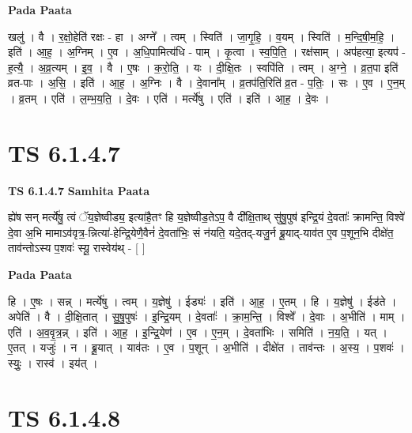 \documentclass[17pt]{extarticle}
\begin{document}
\textbf{Pada Paata} \newline

खलु॑ । वै । र॒क्षो॒हेति॑ रक्षः - हा । अग्ने᳚ । त्वम् । स्विति॑ । जा॒गृ॒हि॒ । व॒यम् । स्विति॑ । म॒न्दि॒षी॒म॒हि॒ । इति॑ । आ॒ह॒ । अ॒ग्निम् । ए॒व । अ॒धि॒पामित्य॑धि - पाम् । कृ॒त्वा । स्व॒पि॒ति॒ । रक्ष॑साम् । अप॑हत्या॒ इत्यप॑ - ह॒त्यै॒ । अ॒व्र॒त्यम् । इ॒व॒ । वै । ए॒षः । क॒रो॒ति॒ । यः । दी॒क्षि॒तः । स्वपि॑ति । त्वम् । अ॒ग्ने॒ । व्र॒त॒पा इति॑ व्रत-पाः । अ॒सि॒ । इति॑ । आ॒ह॒ । अ॒ग्निः । वै । दे॒वाना᳚म् । व्र॒तप॑ति॒रिति॑ व्र॒त - प॒तिः॒ । सः । ए॒व । ए॒न॒म् । व्र॒तम् । एति॑ । ल॒म्भ॒य॒ति॒ । दे॒वः । एति॑ । मर्त्ये॑षु । एति॑ । इति॑ । आ॒ह॒ । दे॒वः ।  \newline





\section{ TS 6.1.4.7 }

\textbf{TS 6.1.4.7 } \newline
\textbf{Samhita Paata} \newline

ह्ये॑ष सन् मर्त्ये॑षु॒ त्वं ॅय॒ज्ञेष्वीड्य॒ इत्या॑है॒तꣳ हि य॒ज्ञेष्वीड॒तेऽप॒ वै दी᳚क्षि॒ताथ् सु॑षु॒पुष॑ इन्द्रि॒यं दे॒वताः᳚ क्रामन्ति॒ विश्वे॑ दे॒वा अ॒भि मामाऽव॑वृत्र॒-न्नित्या॑-हेन्द्रि॒येणै॒वैनं॑ दे॒वता॑भिः॒ सं न॑यति॒ यदे॒तद्-यजु॒र्न ब्रू॒याद्-याव॑त ए॒व प॒शून॒भि दीक्षे॑त॒ ताव॑न्तोऽस्य प॒शवः॑ स्यू॒ रास्वेय॑थ् - [  ] \newline

\textbf{Pada Paata} \newline

हि । ए॒षः । सन्न् । मर्त्ये॑षु । त्वम् । य॒ज्ञेषु॑ । ईड्यः॑ । इति॑ । आ॒ह॒ । ए॒तम् । हि । य॒ज्ञेषु॑ । ईड॑ते । अपेति॑ । वै । दी॒क्षि॒तात् । सु॒षु॒पुषः॑ । इ॒न्द्रि॒यम् । दे॒वताः᳚ । क्रा॒म॒न्ति॒ । विश्वे᳚ । दे॒वाः । अ॒भीति॑ । माम् । एति॑ । अ॒व॒वृ॒त्र॒न्न् । इति॑ । आ॒ह॒ । इ॒न्द्रि॒येण॑ । ए॒व । ए॒न॒म् । दे॒वता॑भिः । समिति॑ । न॒य॒ति॒ । यत् । ए॒तत् । यजुः॑ । न । ब्रू॒यात् । याव॑तः । ए॒व । प॒शून् । अ॒भीति॑ । दीक्षे॑त । ताव॑न्तः । अ॒स्य॒ । प॒शवः॑ । स्युः॒ । रास्व॑ । इय॑त् ।  \newline





\section{ TS 6.1.4.8 }
\end{document}
